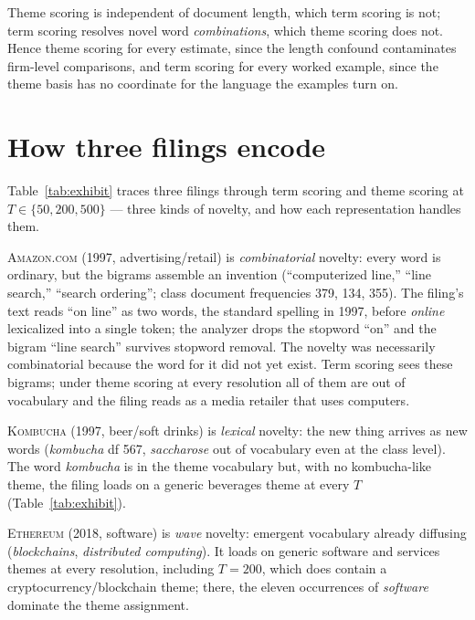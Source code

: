 Theme scoring is independent of document length, which term scoring is not; term scoring
resolves novel word \emph{combinations}, which theme scoring does not. Hence
theme scoring for every estimate, since the length confound contaminates
firm-level comparisons, and term scoring for every worked example, since the
theme basis has no coordinate for the language the examples turn on.

\section{How three filings encode}\label{app:exhibit}

Table~\ref{tab:exhibit} traces three filings through term scoring and theme
scoring at $T \in \{50, 200, 500\}$ --- three kinds of novelty, and how each
representation handles them.

\textsc{Amazon.com} (1997, advertising/retail) is \emph{combinatorial}
novelty: every word is ordinary, but the bigrams assemble an invention
(``computerized line,'' ``line search,'' ``search ordering''; class
document frequencies 379, 134, 355). The filing's text reads ``on line''
as two words, the standard spelling in 1997, before \emph{online}
lexicalized into a single token; the analyzer drops the stopword ``on''
and the bigram ``line search'' survives
stopword removal. The novelty was necessarily combinatorial
because the word for it did not yet exist. Term scoring sees these
bigrams; under theme scoring at every resolution all of them are out of
vocabulary and the filing reads as a media retailer that uses computers.

\textsc{Kombucha} (1997, beer/soft drinks) is \emph{lexical} novelty: the
new thing arrives as new words (\emph{kombucha} df 567, \emph{saccharose}
out of vocabulary even at the class level). The word \emph{kombucha} is in
the theme vocabulary but, with no kombucha-like theme, the filing loads on
a generic beverages theme at every $T$ (Table~\ref{tab:exhibit}).

\textsc{Ethereum} (2018, software) is \emph{wave} novelty: emergent
vocabulary already diffusing (\emph{blockchains}, \emph{distributed
computing}). It loads on generic software and services themes at every
resolution, including $T = 200$, which does contain a
cryptocurrency/blockchain theme; there, the eleven occurrences of
\emph{software} dominate the theme assignment.

